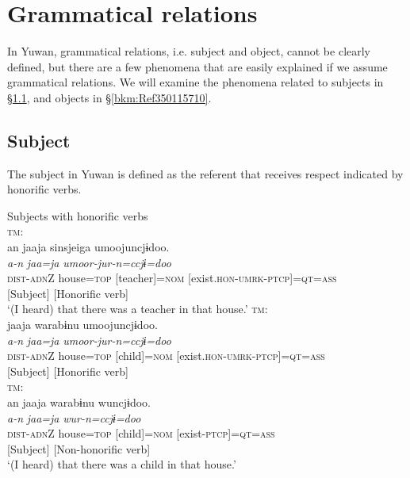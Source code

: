 \chapter{Grammatical relations}\label{chap:3}\hypertarget{RefHeadingToc395696987}{}
In Yuwan, grammatical relations, i.e. subject and object, cannot be clearly defined, but there are a few phenomena that are easily explained if we assume grammatical relations. We will examine the phenomena related to subjects in §\ref{bkm:Ref350115473}, and objects in §\ref{bkm:Ref350115710}.

\section{Subject}
\label{bkm:Ref350115473}\hypertarget{RefHeadingToc395696988}{}
The subject in Yuwan is defined as the referent that receives respect indicated by honorific verbs.

{\smallex
\ea  Subjects with honorific verbs\\
\ea\label{ex:3.1a} \textsc{tm}:\hfill\relax[El: 120924] \\
\gllll          an                               {jaaja}                 {sinsjeiga}                {umoojuncjɨdoo.}\\
                {\itshape a-n}                  {\itshape jaa=ja}         {\itshape umoor-jur-n=ccjɨ=doo}\\
                {\textsc{dist}-\textsc{adn}Z}  {house=\textsc{top}}  {[teacher]=\textsc{nom}}    {[exist.\textsc{hon}-\textsc{umrk}-\textsc{ptcp}]=\textsc{qt}=\textsc{ass}}\\
                     {[Subject]} {} {} {[Honorific verb]}\\
\glt ‘(I heard) that there was a teacher in that house.’ 
\ex\label{ex:3.1b} \textsc{tm}: \hfill\relax [El: 120924]\\
  {jaaja}  {warabɨnu}  {umoojuncjɨdoo.}\\
               {\itshape a-n}  {\itshape jaa=ja}    {\itshape umoor-jur-n=ccjɨ=doo}\\
                {\textsc{dist}-\textsc{adn}Z}  {house=\textsc{top}}  {[child]=\textsc{nom}}  {[exist.\textsc{hon}-\textsc{umrk}-\textsc{ptcp}]=\textsc{qt}=\textsc{ass}}\\
                {[Subject]} {}  {}  {[Honorific verb]}\\

\ex\label{ex:3.1c} \textsc{tm}:\hfill\relax[El: 120924]\\
\gllll  an  {jaaja}  {warabɨnu}  {wuncjɨdoo.}\\
            {\itshape a-n}  {\itshape jaa=ja}    {\itshape wur-n=ccjɨ=doo}\\
            {\textsc{dist}-\textsc{adn}Z}  {house=\textsc{top}}  {[child]=\textsc{nom}}  {[exist-\textsc{ptcp}]=\textsc{qt}=\textsc{ass}}\\
             {[Subject]} {}   {}  {[Non-honorific verb]}\\
   \glt  ‘(I heard) that there was a child in that house.’ 
\z
\z}

